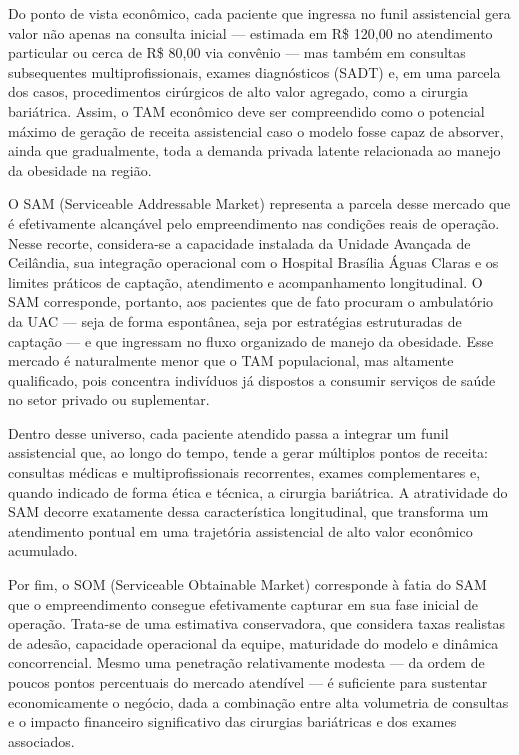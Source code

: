 \documentclass[12pt]{article}
\begin{document}
Do ponto de vista econômico, cada paciente que ingressa no funil assistencial gera valor não apenas na consulta inicial — estimada em R\$ 120,00 no atendimento particular ou cerca de R\$ 80,00 via convênio — mas também em consultas subsequentes multiprofissionais, exames diagnósticos (SADT) e, em uma parcela dos casos, procedimentos cirúrgicos de alto valor agregado, como a cirurgia bariátrica. Assim, o TAM econômico deve ser compreendido como o potencial máximo de geração de receita assistencial caso o modelo fosse capaz de absorver, ainda que gradualmente, toda a demanda privada latente relacionada ao manejo da obesidade na região.

O SAM (Serviceable Addressable Market) representa a parcela desse mercado que é efetivamente alcançável pelo empreendimento nas condições reais de operação. Nesse recorte, considera-se a capacidade instalada da Unidade Avançada de Ceilândia, sua integração operacional com o Hospital Brasília Águas Claras e os limites práticos de captação, atendimento e acompanhamento longitudinal. O SAM corresponde, portanto, aos pacientes que de fato procuram o ambulatório da UAC — seja de forma espontânea, seja por estratégias estruturadas de captação — e que ingressam no fluxo organizado de manejo da obesidade. Esse mercado é naturalmente menor que o TAM populacional, mas altamente qualificado, pois concentra indivíduos já dispostos a consumir serviços de saúde no setor privado ou suplementar.

Dentro desse universo, cada paciente atendido passa a integrar um funil assistencial que, ao longo do tempo, tende a gerar múltiplos pontos de receita: consultas médicas e multiprofissionais recorrentes, exames complementares e, quando indicado de forma ética e técnica, a cirurgia bariátrica. A atratividade do SAM decorre exatamente dessa característica longitudinal, que transforma um atendimento pontual em uma trajetória assistencial de alto valor econômico acumulado.

Por fim, o SOM (Serviceable Obtainable Market) corresponde à fatia do SAM que o empreendimento consegue efetivamente capturar em sua fase inicial de operação. Trata-se de uma estimativa conservadora, que considera taxas realistas de adesão, capacidade operacional da equipe, maturidade do modelo e dinâmica concorrencial. Mesmo uma penetração relativamente modesta — da ordem de poucos pontos percentuais do mercado atendível — é suficiente para sustentar economicamente o negócio, dada a combinação entre alta volumetria de consultas e o impacto financeiro significativo das cirurgias bariátricas e dos exames associados.
\end{document}
